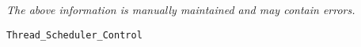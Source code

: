\label{pkg:thread\_scheduler\_control}

{\tiny \it The above information is manually maintained and may contain errors.}
\begin{verbatim}
Thread_Scheduler_Control
\end{verbatim}
